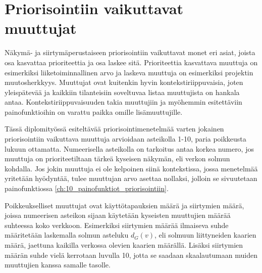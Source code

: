 \section{Priorisointiin vaikuttavat muuttujat} \label{ch:10_priorisointiin_vaikuttavat_muuttujat}

  Näkymä- ja siirtymäperustaiseen priorisointiin vaikuttavat monet eri asiat, joista osa kasvattaa prioriteettia ja osa laskee sitä.
  Prioriteettia kasvattava muuttuja on esimerkiksi liiketoiminnallinen arvo ja laskeva muuttuja on esimerkiksi projektin muutosherkkyys.
  Muuttujat ovat kuitenkin hyvin kontekstiriippuvaisia, joten yleispätevää ja kaikkiin tilanteisiin soveltuvaa listaa muuttujista on hankala antaa.
  Kontekstiriippuvaisuuden takia muuttujiin ja myöhemmin esitettäviin painofunktioihin on varattu paikka omille lisämuuttujille.

  Tässä diplomityössä esiteltävää priorisointimenetelmää varten jokainen priorisointiin vaikuttava muuttuja arvioidaan asteikolla 1-10, paria poikkeusta lukuun ottamatta.
  Numeerisella asteikolla on tarkoitus antaa korkea numero, jos muuttuja on prioriteetiltaan tärkeä kyseisen näkymän, eli verkon solmun kohdalla.
  Jos jokin muuttuja ei ole kelpoinen siinä kontekstissa, jossa menetelmää yritetään hyödyntää, tulee muuttujan arvo asettaa nollaksi, jolloin se sivuutetaan painofunktiossa \ref{ch:10_painofunktiot_priorisointiin}.

  Poikkeukselliset muuttujat ovat käyttötapauksien määrä ja siirtymien määrä, joissa numeerisen asteikon sijaan käytetään kyseisten muuttujien määrää suhteessa koko verkkoon.
  Esimerkiksi siirtymien määrää ilmaiseva suhde määritetään laskemalla solmun asteluku \(d_G(v)\), eli solmuun liittyneiden kaarien määrä, jaettuna kaikilla verkossa olevien kaarien määrällä.
  Lisäksi siirtymien määrän suhde vielä kerrotaan luvulla 10, jotta se saadaan skaalautumaan muiden muuttujien kanssa samalle tasolle.

